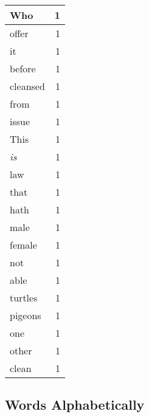 \begin{center}
\begin{longtable}{l|r}
Who & 1 \\ \hline
offer & 1 \\ \hline
it & 1 \\ \hline
before & 1 \\ \hline
cleansed & 1 \\ \hline
from & 1 \\ \hline
issue & 1 \\ \hline
This & 1 \\ \hline
\emph{is} & 1 \\ \hline
law & 1 \\ \hline
that & 1 \\ \hline
hath & 1 \\ \hline
male & 1 \\ \hline
female & 1 \\ \hline
not & 1 \\ \hline
able & 1 \\ \hline
turtles & 1 \\ \hline
pigeons & 1 \\ \hline
one & 1 \\ \hline
other & 1 \\ \hline
clean & 1 \\ \hline
\end{longtable}
\end{center}



\normalsize



\subsection{Words Alphabetically}

